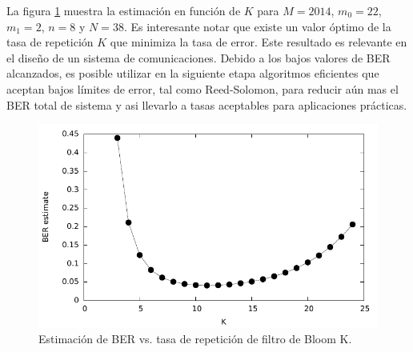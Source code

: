 La figura \ref{BERvsK} muestra la estimación en función de $K$ para $M=2014$, $m_{0} = 22$, $m_{1} = 2$, $n = 8$ y $N=38$. Es interesante notar que existe un valor óptimo de la tasa de repetición $K$ que minimiza la tasa de error. Este resultado es relevante en el diseño de un sistema de comunicaciones. Debido a los bajos valores de BER alcanzados, es posible utilizar en la siguiente etapa algoritmos eficientes que aceptan bajos límites de error, tal como Reed-Solomon, para reducir aún mas el BER total de sistema y asi llevarlo a tasas aceptables para aplicaciones prácticas.

\begin{figure}[!t]
  \centering
    \includegraphics[width=5in]{graphs/Kcalc}
    \caption{Estimación de BER vs. tasa de repetición de filtro de Bloom K.}
    \label{BERvsK}
\end{figure}

